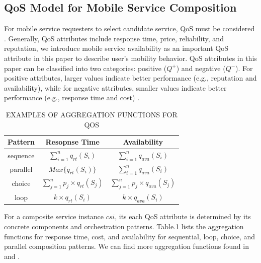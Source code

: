 \documentclass[10pt,journal,compsoc]{IEEEtran}
\begin{document}
\subsection{QoS Model for Mobile Service Composition}
For mobile service requesters to select candidate service, QoS must be considered \cite{wu2013predicting,luo2014efficient,luo2016generating}. Generally, QoS attributes include response time, price, reliability, and reputation, we introduce mobile service availability as an important QoS attribute in this paper to describe user's mobility behavior. QoS attributes in this paper can be classified into two categories: positive ($Q^+$) and negative ($Q^{-}$). For positive attributes, larger values indicate better performance (e.g., reputation and availability), while for negative attributes, smaller values indicate better performance (e.g., response time and cost) \cite{Wu2016}.	

\begin{table}[!t]
\renewcommand{\arraystretch}{1.3}
\caption{EXAMPLES OF AGGREGATION FUNCTIONS FOR QOS}
\label{table_example}
\centering
\begin{tabular}{ccc}
\hline
\bfseries Pattern & \bfseries Resopnse Time & \bfseries Availability \\
\hline
sequence & $\sum_{i=1}^{n}q_{rt}(S_i)$ & $\sum_{i=1}^{n}q_{ava}(S_i)$ \\
parallel & $Max\{q_{rt}(S_i)\}$ & $\sum_{i=1}^{n}q_{ava}(S_i)$ \\
choice & $\sum_{j=1}^{n} p_j \times q_{rt}(S_j)$ & $\sum_{j=1}^{n} p_j \times q_{ava}(S_j)$ \\
loop & $k \times q_{rt}(S_i)$ & $k \times q_{ava}(S_i)$ \\
\hline
\end{tabular}
\end{table}

For a composite service instance $csi$, its each QoS attribute is determined by its concrete components and orchestration patterns. Table.1 lists the aggregation functions for response time, cost, and availability for sequential, loop, choice, and parallel composition patterns. We can find more aggregation functions found in \cite{jaeger2004qos} and \cite{zheng2013qos}.
\end{document}
